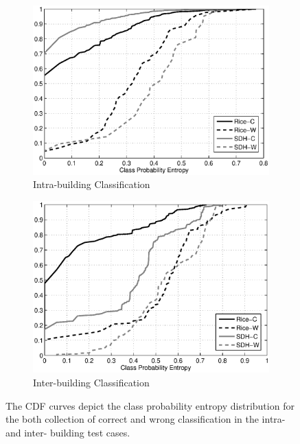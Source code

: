 \begin{figure}[ht!]
\centering
	\begin{subfigure}{0.48\textwidth}
                \centering
		\includegraphics[width=\textwidth]{./fig/cdf_intra.eps}
                \caption{Intra-building Classification}
                \label{fig:cdf_intra}
	\end{subfigure}
	\begin{subfigure}{0.48\textwidth}
                \centering
		\includegraphics[width=\textwidth]{./fig/cdf_inter.eps}
                \caption{Inter-building Classification}
                \label{fig:cdf_inter}
	\end{subfigure}
\caption{The CDF curves depict the class probability entropy distribution for the both collection of correct and wrong classification in the intra- and inter- building test cases.}
\label{fig:cdf}
\end{figure}


